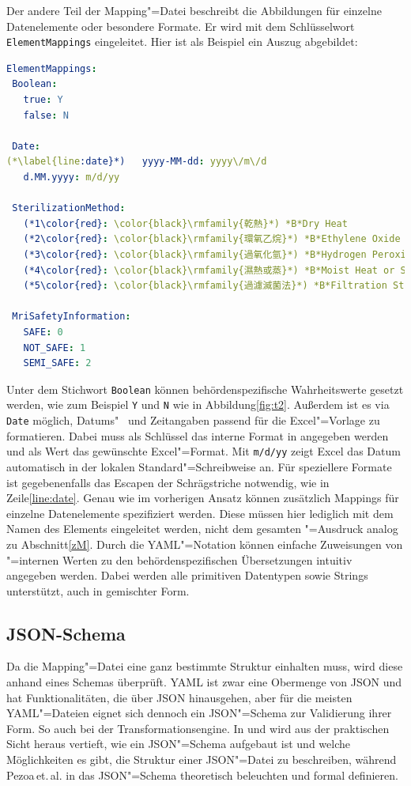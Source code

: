 Der andere Teil der Mapping"=Datei beschreibt die Abbildungen für einzelne Datenelemente oder besondere Formate. Er wird mit dem Schlüsselwort \texttt{ElementMappings} eingeleitet. Hier ist als Beispiel ein Auszug abgebildet:
\begin{lstlisting}[language=yaml,caption={Beispiel einer Mapping-Datei für \texttt{ElementMappings}}]
ElementMappings:
 Boolean:
   true: Y
   false: N
   
 Date:
(*\label{line:date}*)   yyyy-MM-dd: yyyy\/m\/d
   d.MM.yyyy: m/d/yy
   
 SterilizationMethod:
   (*1\color{red}: \color{black}\rmfamily{乾熱}*) *B*Dry Heat
   (*2\color{red}: \color{black}\rmfamily{環氧乙烷}*) *B*Ethylene Oxide
   (*3\color{red}: \color{black}\rmfamily{過氧化氫}*) *B*Hydrogen Peroxide
   (*4\color{red}: \color{black}\rmfamily{濕熱或蒸}*) *B*Moist Heat or Steam
   (*5\color{red}: \color{black}\rmfamily{過濾滅菌法}*) *B*Filtration Sterilization
   
 MriSafetyInformation:
   SAFE: 0
   NOT_SAFE: 1
   SEMI_SAFE: 2
\end{lstlisting}
Unter dem Stichwort \texttt{Boolean} können behördenspezifische Wahrheitswerte gesetzt werden, wie zum Beispiel \texttt{Y} und \texttt{N} wie in Abbildung\nbs\ref{fig:t2}. Außerdem ist es via \texttt{Date} möglich, Datums"~ und Zeitangaben passend für die Excel"=Vorlage zu formatieren. Dabei muss als Schlüssel das interne Format in  angegeben werden und als Wert das gewünschte Excel"=Format. Mit \texttt{m/d/yy} zeigt Excel das Datum automatisch in der lokalen Standard"=Schreibweise an. Für speziellere Formate ist gegebenenfalls das Escapen der Schrägstriche notwendig, wie in Zeile\nbs\ref{line:date}. Genau wie im vorherigen Ansatz können zusätzlich Mappings für einzelne Datenelemente spezifiziert werden. Diese müssen hier lediglich mit dem Namen des Elements eingeleitet werden, nicht dem gesamten "=Ausdruck analog zu Abschnitt\nbs\ref{zM}. Durch die YAML"=Notation können einfache Zuweisungen von "=internen Werten zu den behördenspezifischen Übersetzungen intuitiv angegeben werden. Dabei werden alle primitiven Datentypen sowie Strings unterstützt, auch in gemischter Form.

\subsection{JSON-Schema}\label{JSch}
Da die Mapping"=Datei eine ganz bestimmte Struktur einhalten muss, wird diese anhand eines Schemas überprüft. YAML ist zwar eine Obermenge von JSON und hat Funktionalitäten, die über JSON hinausgehen, aber für die meisten YAML"=Dateien eignet sich dennoch ein JSON"=Schema zur Validierung ihrer Form. So auch bei der Transformationsengine. In\nbs\cite{json:schema} und\nbs\cite[S.\,21--29]{json:wallace} wird aus der praktischen Sicht heraus vertieft, wie ein JSON"=Schema aufgebaut ist und welche Möglichkeiten es gibt, die Struktur einer JSON"=Datei zu beschreiben, während Pezoa\,et.\,al. in\nbs\cite{json:schema:def} das JSON"=Schema theoretisch beleuchten und formal definieren.

